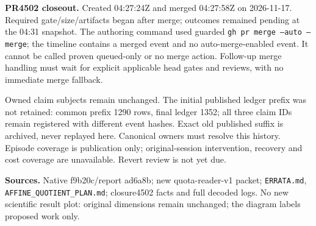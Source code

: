 \documentclass[10pt]{article}
\begin{document}
\textbf{PR4502 closeout.} Created 04:27:24Z and merged 04:27:58Z on
2026-11-17. Required gate/size/artifacts began after merge; outcomes remained
pending at the 04:31 snapshot. The authoring command used guarded
\texttt{gh pr merge --auto --merge}; the timeline contains a merged event and
no auto-merge-enabled event. It cannot be called proven queued-only or no
merge action. Follow-up merge handling must wait for explicit applicable head
gates and reviews, with no immediate merge fallback.

Owned claim subjects remain unchanged. The initial published ledger prefix
was not retained: common prefix 1290 rows, final ledger 1352; all three claim
IDs remain registered with different event hashes. Exact old published suffix
is archived, never replayed here. Canonical owners must resolve this history.
Episode coverage is publication only; original-session intervention, recovery
and cost coverage are unavailable. Revert review is not yet due.

\textbf{Sources.} Native f9b20c/report ad6a8b; new quota-reader-v1 packet;
\texttt{ERRATA.md}, \texttt{AFFINE\_QUOTIENT\_PLAN.md}; closure4502 facts and
full decoded logs. No new scientific result plot: original dimensions remain
unchanged; the diagram labels proposed work only.
\end{document}
